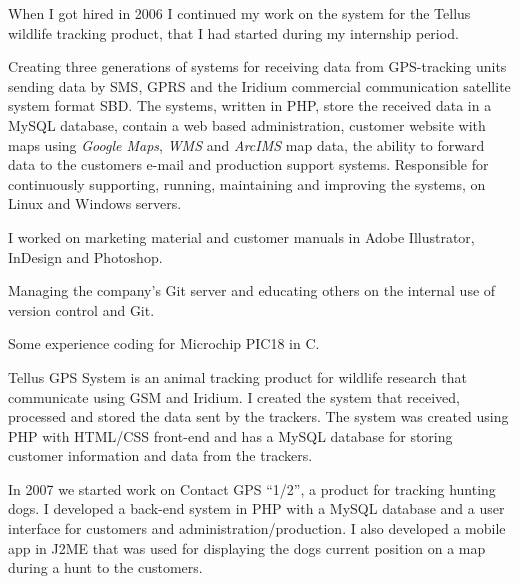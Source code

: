 \documentclass{cv-stylish}
\begin{document}
\begin{center}
\begin{adjustwidth}{0.015\linewidth}{0.015\linewidth}
When I got hired in 2006 I continued my work on the system for the
Tellus wildlife tracking product, that I had started during my
internship period.

\begin{compactitem}
  \item Creating three generations of systems for receiving data from
    GPS-tracking units sending data by SMS, GPRS and the Iridium
    commercial communication satellite system format SBD.
    The systems, written in PHP, store the received data in a MySQL
    database, contain a web based administration, customer website
    with maps using \emph{Google Maps}, \emph{WMS} and \emph{ArcIMS} map data, the ability to forward
    data to the customers e-mail and production support
    systems. Responsible for continuously supporting, running,
    maintaining and improving the systems, on Linux and Windows
    servers.
  \item I worked on marketing material and customer manuals in Adobe
    Illustrator, InDesign and Photoshop.
  \item Managing the company's Git server and educating others on the
    internal use of version control and Git.
  \item Some experience coding for Microchip PIC18 in C.
\end{compactitem}

Tellus GPS System is an animal tracking product for wildlife research
that communicate using GSM and Iridium. I created the system that
received, processed and stored the data sent by the trackers. The
system was created using PHP with HTML/CSS front-end and has
a MySQL database for storing customer information and data from the
trackers.

In 2007 we started work on Contact GPS ``1/2'', a product for tracking
hunting dogs. I developed a back-end system in PHP with a MySQL
database and a user interface for customers and
administration/production.
I also developed a mobile app in J2ME that was used for displaying the
dogs current position on a map during a hunt to the customers.

\end{adjustwidth}




\end{center}
\end{document}
